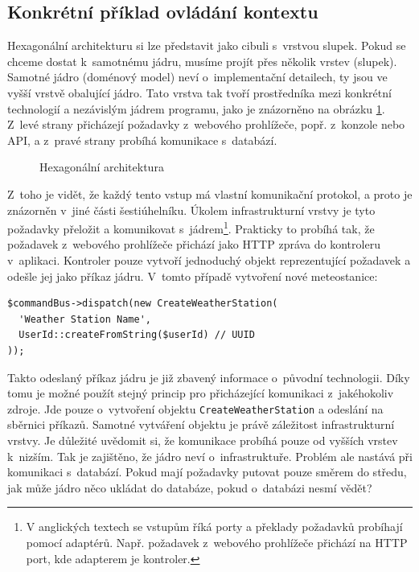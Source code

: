 \subsection{Konkrétní příklad ovládání kontextu}
Hexagonální architekturu si lze představit jako cibuli s~vrstvou slupek. Pokud se chceme dostat k~samotnému jádru, musíme projít přes několik vrstev (slupek). Samotné jádro (doménový model) neví o~implementační detailech, ty jsou ve vyšší vrstvě obalující jádro. Tato vrstva tak tvoří prostředníka mezi konkrétní technologií a nezávislým jádrem programu, jako je znázorněno na obrázku \ref{fig:hex1}. Z~levé strany přicházejí požadavky z~webového prohlížeče, popř. z~konzole nebo API, a z~pravé strany probíhá komunikace s~databází.

\begin{figure}[h]
    \centering
	\caption{Hexagonální architektura}
	\label{fig:hex1}
\end{figure}

Z~toho je vidět, že každý tento vstup má vlastní komunikační protokol, a proto je znázorněn v~jiné části šestiúhelníku. Úkolem infrastrukturní vrstvy je tyto požadavky přeložit a komunikovat s~jádrem\footnote{V anglických textech se vstupům říká porty a překlady požadavků probíhají pomocí adaptérů. Např. požadavek z~webového prohlížeče přichází na HTTP port, kde adapterem je kontroler.}. Prakticky to probíhá tak, že požadavek z~webového prohlížeče přichází jako HTTP zpráva do kontroleru v~aplikaci. Kontroler pouze vytvoří jednoduchý objekt reprezentující požadavek a odešle jej jako příkaz jádru. V~tomto případě vytvoření nové meteostanice:

\begin{verbatim}
$commandBus->dispatch(new CreateWeatherStation(
  'Weather Station Name',
  UserId::createFromString($userId) // UUID
));
\end{verbatim}

Takto odeslaný příkaz jádru je již zbavený informace o~původní technologii. Díky tomu je možné použít stejný princip pro přicházející komunikaci z~jakéhokoliv zdroje. Jde pouze o~vytvoření objektu \texttt{CreateWeatherStation} a odeslání na sběrnici příkazů. Samotné vytváření objektu je právě záležitost infrastrukturní vrstvy. Je důležité uvědomit si, že komunikace probíhá pouze od vyšších vrstev k~nizším. Tak je zajištěno, že jádro neví o~infrastruktuře. Problém ale nastává při komunikaci s~databází. Pokud mají požadavky putovat pouze směrem do středu, jak může jádro něco ukládat do databáze, pokud o~databázi nesmí vědět?

